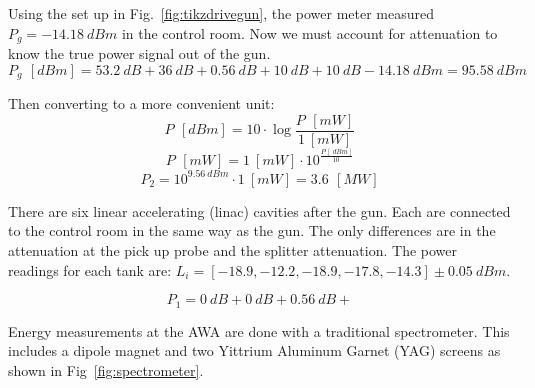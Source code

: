 \documentclass{iitthesis}
\begin{document}
\fi

Using the set up in Fig.~\ref{fig:tikzdrivegun}, the power meter measured  $P_{g} = \SI{-14.18}{dBm}$
in the control room. Now we must account for attenuation to know the true power
signal out of the gun. 
\begin{equation}
P_g \, \SI{}{[dBm]} = \SI{53.2}{dB} + \SI{36}{dB} + \SI{0.56}{dB} + \SI{10}{dB}+ \SI{10}{dB} - \SI{14.18}{dBm} = \SI{95.58}{dBm}
\end{equation}

Then converting to a more convenient unit: 
\begin{equation}
P \, \SI{}{[dBm]} = 10 \cdot \log{\frac{P \, \SI{}{[mW]}}{\SI{1}{[mW]}}}
\end{equation}
\begin{equation} \label{eq:dbmtomw}
P \, \SI{}{[mW]} = \SI{1}{[mW]} \cdot 10^{\frac{P \, [\SI{}{dBm}]}{\SI{10}{}}}
\end{equation}
\begin{equation} 
P_2 = 10^{\SI{9.56}{dBm}} \cdot  \SI{1}{[mW]} = 3.6 \, \SI{}{[MW]} 
\end{equation}

There are six linear accelerating (linac) cavities after the gun. 
Each are connected to the control room in the same way as the gun. 
The only differences are in the attenuation at the pick up probe and 
the splitter attenuation. The power readings for each tank are: 
$L_i=[-18.9,-12.2,-18.9,-17.8,-14.3]\pm \SI{0.05}{dBm}$. 

\begin{equation}
P_1 = \SI{0}{dB} + \SI{0}{dB} + \SI{0.56}{dB} + 
\end{equation}



 \label{sec:dipolecal}
Energy measurements at the AWA are done with a traditional 
spectrometer. This includes a dipole magnet and two Yittrium 
Aluminum Garnet (YAG) screens as shown in Fig~\ref{fig:spectrometer}.
\end{document}
